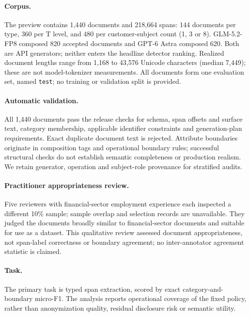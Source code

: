 \paragraph{Corpus.}
The preview contains 1,440 documents and 218,664 spans: 144 documents per type, 360 per T level, and 480 per customer-subject count (1, 3 or 8). GLM-5.2-FP8 composed 820 accepted documents and GPT-6 Astra composed 620. Both are API generators; neither enters the headline detector ranking. Realized document lengths range from 1,168 to 43,576 Unicode characters (median 7,449); these are not model-tokenizer measurements. All documents form one evaluation set, named \texttt{test}; no training or validation split is provided.

\paragraph{Automatic validation.}
All 1,440 documents pass the release checks for schema, span offsets and surface text, category membership, applicable identifier constraints and generation-plan requirements. Exact duplicate document text is rejected. Attribute boundaries originate in composition tags and operational boundary rules; successful structural checks do not establish semantic completeness or production realism. We retain generator, operation and subject-role provenance for stratified audits.

\paragraph{Practitioner appropriateness review.}
Five reviewers with financial-sector employment experience each inspected a different 10\% sample; sample overlap and selection records are unavailable. They judged the documents broadly similar to financial-sector documents and suitable for use as a dataset. This qualitative review assessed document appropriateness, not span-label correctness or boundary agreement; no inter-annotator agreement statistic is claimed.

\paragraph{Task.}
The primary task is typed span extraction, scored by exact category-and-boundary micro-F1. The analysis reports operational coverage of the fixed policy, rather than anonymization quality, residual disclosure risk or semantic utility.


